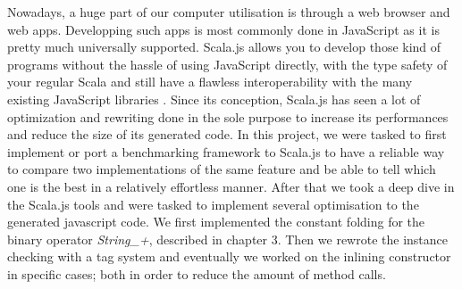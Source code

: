 Nowadays, a huge part of our computer utilisation is through a web browser and
web apps.
Developping such apps is most commonly done in JavaScript as it is pretty much
universally supported. Scala.js allows you to develop those kind of programs
without the hassle of using JavaScript directly, with the type safety of your
regular Scala and still have a flawless interoperability with the many existing
JavaScript libraries \cite{scalajsInterop}.
Since its conception, Scala.js has seen a lot of optimization and rewriting
done in the sole purpose to increase its performances and reduce the size of
its generated code.
In this project, we were tasked to first implement or port a benchmarking
framework to Scala.js to have a reliable way to compare two implementations of
the same feature and be able to tell which one is the best in a relatively
effortless manner.
After that we took a deep dive in the Scala.js tools and were tasked to
implement several optimisation to the generated javascript code. We first
implemented the constant folding for the binary operator \emph{String\_+},
described in chapter 3. Then we rewrote the instance checking with a tag system
and eventually we worked on the inlining constructor in specific cases; both in
order to reduce the amount of method calls.
